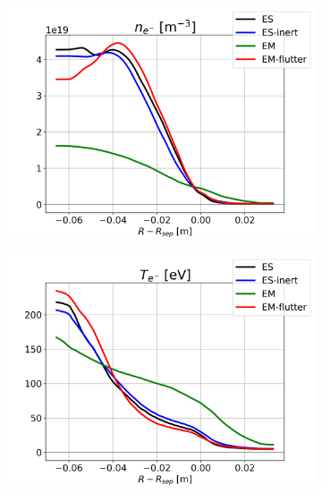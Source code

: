 \begin{figure}[H]\centering
	\begin{subfigure}[t]{0.30\textwidth}
		\centering
		\includegraphics[width=1\textwidth]{schemes/OMP_profiles_e-_n.png}
	\end{subfigure}	
	\begin{subfigure}[t]{0.30\textwidth}
		\centering
		\includegraphics[width=1\textwidth]{schemes/OMP_profiles_e-_T.png}
	\end{subfigure}
	\begin{subfigure}[t]{0.30\textwidth}
		\centering

\end{subfigure}
\end{figure}
